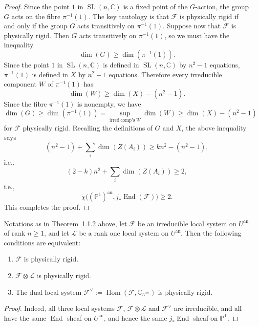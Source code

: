 \begin{proof}
Since the point \(1\) in \(\operatorname{SL}(n,\mathbb{C})\) is a fixed point
of the \(G\)-action, the group \(G\) acts on the fibre \(\pi^{-1}(1)\). The key
tautology is that \(\mathcal{F}\) is physically rigid if and only if the group
\(G\) acts transitively on \(\pi^{-1}(1)\). Suppose now that \(\mathcal{F}\) is
physically rigid. Then \(G\) acts transitively on \(\pi^{-1}(1)\), so we must
have the inequality
\[
  \dim(G)\geq \dim(\pi^{-1}(1)).
\]
Since the point \(1\) in \(\operatorname{SL}(n,\mathbb{C})\) is defined in
\(\operatorname{SL}(n,\mathbb{C})\) by \(n^2-1\) equations,
\(\pi^{-1}(1)\) is defined in \(X\) by \(n^2-1\) equations. Therefore every
irreducible component \(W\) of \(\pi^{-1}(1)\) has
\[
  \dim(W)\geq\dim(X)-(n^2-1).
\]
Since the fibre \(\pi^{-1}(1)\) is nonempty, we have
\[
  \dim(G)\geq\dim(\pi^{-1}(1))
  =
  \sup_{\mathrm{irred\ comp's}\ W}\dim(W)
  \geq
  \dim(X)-(n^2-1)
\]
for \(\mathcal{F}\) physically rigid. Recalling the definitions of \(G\) and
\(X\), the above inequality says
\[
  (n^2-1)+\sum_i\dim(Z(A_i))\geq kn^2-(n^2-1),
\]
i.e.,
\[
  (2-k)n^2+\sum_i\dim(Z(A_i))\geq 2,
\]
i.e.,
\[
  \chi\bigl((\mathbb{P}^1)^{\mathrm{an}},
    j_*\operatorname{End}(\mathcal{F})\bigr)\geq 2.
\]
This completes the proof.
\end{proof}

\setcounter{theorem}{2}
\begin{corollary}
\label{cor:1.1.3}
Notations as in \hyperref[thm:1.1.2]{Theorem~1.1.2} above, let \(\mathcal{F}\) be an irreducible
local system on \(U^{\mathrm{an}}\) of rank \(n\geq 1\), and let
\(\mathcal{L}\) be a rank one local system on \(U^{\mathrm{an}}\). Then the
following conditions are equivalent:
\begin{enumerate}[label=(\arabic*)]
\item \(\mathcal{F}\) is physically rigid.
\item \(\mathcal{F}\otimes\mathcal{L}\) is physically rigid.
\item The dual local system
\(\mathcal{F}^{\vee}:=\operatorname{Hom}(\mathcal{F},\mathbb{C}_{U^{\mathrm{an}}})\)
is physically rigid.
\end{enumerate}
\end{corollary}

\begin{proof}
Indeed, all three local systems \(\mathcal{F}\),
\(\mathcal{F}\otimes\mathcal{L}\) and \(\mathcal{F}^{\vee}\) are irreducible,
and all have the same \(\operatorname{End}\) sheaf on \(U^{\mathrm{an}}\), and
hence the same \(j_*\operatorname{End}\) sheaf on \(\mathbb{P}^1\).
\end{proof}

